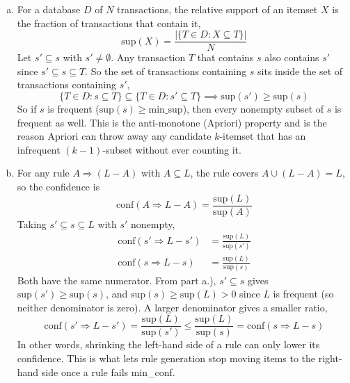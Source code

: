\documentclass[12pt,letterpaper, onecolumn]{exam}
\begin{document}
\begin{questions}
\begin{solution}
        \begin{enumerate}[a.)]
            \item For a database $D$ of $N$ transactions, the relative support of an itemset $X$ is the fraction of transactions that contain it,
            \begin{equation*}
                \text{sup}(X) = \frac{|\{T\in D : X\subseteq T\}|}{N}
            \end{equation*}
            Let $s'\subseteq s$ with $s'\neq\emptyset$. Any transaction $T$ that contains $s$ also contains $s'$ since $s'\subseteq s\subseteq T$. So the set of transactions containing $s$ sits inside the set of transactions containing $s'$,
            \begin{equation*}
                \{T\in D : s\subseteq T\} \subseteq \{T\in D : s'\subseteq T\} \implies \text{sup}(s') \geq \text{sup}(s)
            \end{equation*}
            So if $s$ is frequent ($\text{sup}(s)\geq \text{min\_sup}$), then every nonempty subset of $s$ is frequent as well. This is the anti-monotone (Apriori) property and is the reason Apriori can throw away any candidate $k$-itemset that has an infrequent $(k-1)$-subset without ever counting it.
            \item For any rule $A\Rightarrow (L-A)$ with $A\subseteq L$, the rule covers $A\cup(L-A)=L$, so the confidence is
            \begin{equation*}
                \text{conf}(A\Rightarrow L-A) = \frac{\text{sup}(L)}{\text{sup}(A)}
            \end{equation*}
            Taking $s'\subseteq s\subseteq L$ with $s'$ nonempty,
            \begin{align*}
                \text{conf}(s'\Rightarrow L-s') &= \frac{\text{sup}(L)}{\text{sup}(s')} \\
                \text{conf}(s\Rightarrow L-s) &= \frac{\text{sup}(L)}{\text{sup}(s)}
            \end{align*}
            Both have the same numerator. From part a.), $s'\subseteq s$ gives $\text{sup}(s')\geq\text{sup}(s)$, and $\text{sup}(s)\geq\text{sup}(L)>0$ since $L$ is frequent (so neither denominator is zero). A larger denominator gives a smaller ratio,
            \begin{equation*}
                \text{conf}(s'\Rightarrow L-s') = \frac{\text{sup}(L)}{\text{sup}(s')} \leq \frac{\text{sup}(L)}{\text{sup}(s)} = \text{conf}(s\Rightarrow L-s)
            \end{equation*}
            In other words, shrinking the left-hand side of a rule can only lower its confidence. This is what lets rule generation stop moving items to the right-hand side once a rule fails min\_conf.
        \end{enumerate}


\end{solution}
\end{questions}
\end{document}
